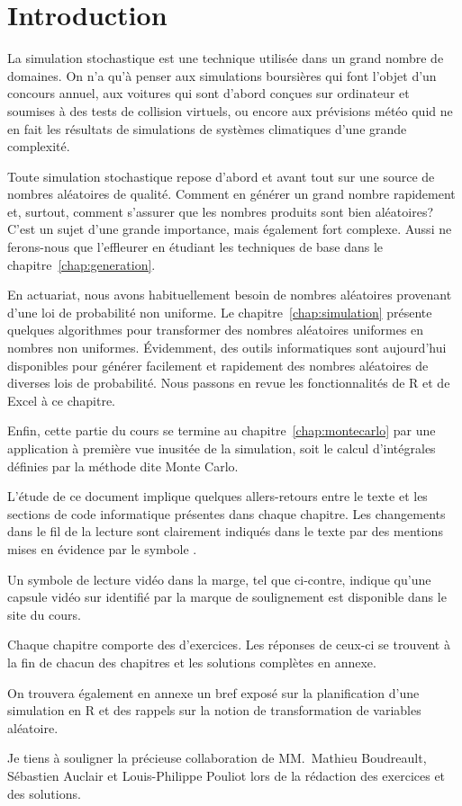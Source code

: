 \chapter*{Introduction}

La simulation stochastique est une technique utilisée dans un grand
nombre de domaines. On n'a qu'à penser aux simulations boursières qui
font l'objet d'un concours annuel, aux voitures qui sont d'abord
conçues sur ordinateur et soumises à des tests de collision virtuels,
ou encore aux prévisions météo quid ne en fait les résultats de
simulations de systèmes climatiques d'une grande complexité.

Toute simulation stochastique repose d'abord et avant tout sur une
source de nombres aléatoires de qualité. Comment en générer un grand
nombre rapidement et, surtout, comment s'assurer que les nombres
produits sont bien aléatoires? C'est un sujet d'une grande importance,
mais également fort complexe. Aussi ne ferons-nous que l'effleurer en
étudiant les techniques de base dans le
chapitre~\ref{chap:generation}.

En actuariat, nous avons habituellement besoin de nombres aléatoires
provenant d'une loi de probabilité non uniforme. Le
chapitre~\ref{chap:simulation} présente quelques algorithmes pour
transformer des nombres aléatoires uniformes en nombres non uniformes.
Évidemment, des outils informatiques sont aujourd'hui disponibles pour
générer facilement et rapidement des nombres aléatoires de diverses
lois de probabilité. Nous passons en revue les fonctionnalités de R et
de Excel à ce chapitre.

Enfin, cette partie du cours se termine au
chapitre~\ref{chap:montecarlo} par une application à première vue
inusitée de la simulation, soit le calcul d'intégrales définies par la
méthode dite Monte Carlo.

L'étude de ce document implique quelques allers-retours entre le texte
et les sections de code informatique présentes dans chaque chapitre.
Les changements dans le fil de la lecture sont clairement indiqués
dans le texte par des mentions mises en évidence par le symbole
{\color{darkred}\noway}.

Un symbole de lecture vidéo dans la marge, tel que ci-contre, indique
qu'une capsule vidéo sur  identifié par la marque de
soulignement est disponible dans le site du cours.

Chaque chapitre comporte des d'exercices. Les réponses de ceux-ci se
trouvent à la fin de chacun des chapitres et les solutions complètes
en annexe.

On trouvera également en annexe un bref exposé sur la planification
d'une simulation en R et des rappels sur la notion de transformation
de variables aléatoire.

Je tiens à souligner la précieuse collaboration de MM.~Mathieu
Boudreault, Sébastien Auclair et Louis-Philippe Pouliot lors de la
rédaction des exercices et des solutions.


